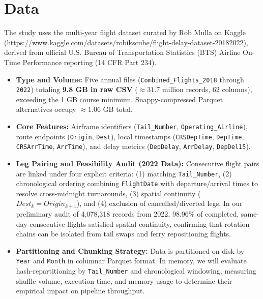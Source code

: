 \documentclass{article}
\begin{document}
\section{Data}
The study uses the multi-year flight dataset curated by Rob Mulla on Kaggle (\url{https://www.kaggle.com/datasets/robikscube/flight-delay-dataset-20182022}), derived from official U.S. Bureau of Transportation Statistics (BTS) Airline On-Time Performance reporting (14 CFR Part 234).
\begin{itemize}
    \item \textbf{Type and Volume:} Five annual files (\texttt{Combined\_Flights\_2018} through \texttt{2022}) totaling \textbf{9.8 GB in raw CSV} ($\approx 31.7$ million records, 62 columns), exceeding the 1 GB course minimum. Snappy-compressed Parquet alternatives occupy $\approx 1.06$ GB total.
    \item \textbf{Core Features:} Airframe identifiers (\texttt{Tail\_Number}, \texttt{Operating\_Airline}), route endpoints (\texttt{Origin}, \texttt{Dest}), local timestamps (\texttt{CRSDepTime}, \texttt{DepTime}, \texttt{CRSArrTime}, \texttt{ArrTime}), and delay metrics (\texttt{DepDelay}, \texttt{ArrDelay}, \texttt{DepDel15}).
    \item \textbf{Leg Pairing and Feasibility Audit (2022 Data):} Consecutive flight pairs are linked under four explicit criteria: (1) matching \texttt{Tail\_Number}, (2) chronological ordering combining \texttt{FlightDate} with departure/arrival times to resolve cross-midnight turnarounds, (3) spatial continuity ($Dest_k = Origin_{k+1}$), and (4) exclusion of cancelled/diverted legs. In our preliminary audit of 4,078,318 records from 2022, 98.96\% of completed, same-day consecutive flights satisfied spatial continuity, confirming that rotation chains can be isolated from tail swaps and ferry repositioning flights.
    \item \textbf{Partitioning and Chunking Strategy:} Data is partitioned on disk by \texttt{Year} and \texttt{Month} in columnar Parquet format. In memory, we will evaluate hash-repartitioning by \texttt{Tail\_Number} and chronological windowing, measuring shuffle volume, execution time, and memory usage to determine their empirical impact on pipeline throughput.
\end{itemize}
\end{document}
